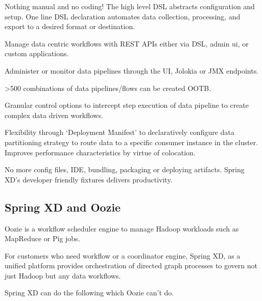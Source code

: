 \begin{itemize*}
\item Nothing manual and no coding! The high level DSL abstracts configuration and setup. One line DSL declaration automates data collection, processing, and export to a desired format or destination.
\item Manage data centric workflows with REST APIs either via DSL, admin ui, or custom applications.
\item Administer or monitor data pipelines through the UI, Jolokia or JMX endpoints. 
\item >500 combinations of data pipelines/flows can be created OOTB.
\item Granular control options to intercept step execution of data pipeline to create complex data driven workflows.
\item Flexibility through `Deployment Manifest' to declaratively configure data partitioning strategy to route data to a specific consumer instance in the cluster. Improves performance characteristics by virtue of colocation.
\end{itemize*}

No more config files, IDE, bundling, packaging or deploying artifacts. Spring XD's developer friendly fixtures delivers productivity. 

\subsection{Spring XD and Oozie}
Oozie is a workflow scheduler engine to manage Hadoop workloads such as MapReduce or Pig jobs. 

For customers who need workflow or a coordinator engine, Spring XD, as a unified platform provides orchestration of directed graph processes to govern not just Hadoop but any data workflows. 

Spring XD can do the following which Oozie can't do.

